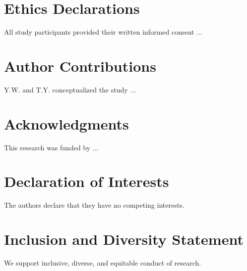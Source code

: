 \documentclass[preprint,review,12pt]{elsarticle}\n
\begin{document}
% 


\n


\section*{Ethics Declarations}
All study participants provided their written informed consent ...
\label{ethics declarations}

\section*{Author Contributions}
Y.W. and T.Y. conceptualized the study ...
\label{author contributions}

\section*{Acknowledgments}
This research was funded by ...
\label{acknowledgments}

\section*{Declaration of Interests}
The authors declare that they have no competing interests.
\label{declaration of interests}

\section*{Inclusion and Diversity Statement}
We support inclusive, diverse, and equitable conduct of research.
\label{inclusion and diversity statement}

\end{document}
